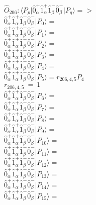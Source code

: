 \documentclass[14pt]{article}
\begin{document}
    $\hat{O}_{206}:  \langle{P_p}\vert \hat{0}_{\alpha}^{+}\hat{1}_{\alpha}^{+}\hat{1}_{\beta}^{-}\hat{0}_{\beta}^{-} \vert{P_q}\rangle => $ \\ 
    $ \hat{0}_{\alpha}^{+}\hat{1}_{\alpha}^{+}\hat{1}_{\beta}^{-}\hat{0}_{\beta}^{-} \vert{P_{0}}\rangle =  $ \\ 
    $ \hat{0}_{\alpha}^{+}\hat{1}_{\alpha}^{+}\hat{1}_{\beta}^{-}\hat{0}_{\beta}^{-} \vert{P_{1}}\rangle =  $ \\ 
    $ \hat{0}_{\alpha}^{+}\hat{1}_{\alpha}^{+}\hat{1}_{\beta}^{-}\hat{0}_{\beta}^{-} \vert{P_{2}}\rangle =  $ \\ 
    $ \hat{0}_{\alpha}^{+}\hat{1}_{\alpha}^{+}\hat{1}_{\beta}^{-}\hat{0}_{\beta}^{-} \vert{P_{3}}\rangle =  $ \\ 
    $ \hat{0}_{\alpha}^{+}\hat{1}_{\alpha}^{+}\hat{1}_{\beta}^{-}\hat{0}_{\beta}^{-} \vert{P_{4}}\rangle =  $ \\ 
    $ \hat{0}_{\alpha}^{+}\hat{1}_{\alpha}^{+}\hat{1}_{\beta}^{-}\hat{0}_{\beta}^{-} \vert{P_{5}}\rangle = {r}_{206,4,5}P_{4} $ \\ 
    ${r}_{206,4,5}\ =\ 1 $ \\ 
    $ \hat{0}_{\alpha}^{+}\hat{1}_{\alpha}^{+}\hat{1}_{\beta}^{-}\hat{0}_{\beta}^{-} \vert{P_{6}}\rangle =  $ \\ 
    $ \hat{0}_{\alpha}^{+}\hat{1}_{\alpha}^{+}\hat{1}_{\beta}^{-}\hat{0}_{\beta}^{-} \vert{P_{7}}\rangle =  $ \\ 
    $ \hat{0}_{\alpha}^{+}\hat{1}_{\alpha}^{+}\hat{1}_{\beta}^{-}\hat{0}_{\beta}^{-} \vert{P_{8}}\rangle =  $ \\ 
    $ \hat{0}_{\alpha}^{+}\hat{1}_{\alpha}^{+}\hat{1}_{\beta}^{-}\hat{0}_{\beta}^{-} \vert{P_{9}}\rangle =  $ \\ 
    $ \hat{0}_{\alpha}^{+}\hat{1}_{\alpha}^{+}\hat{1}_{\beta}^{-}\hat{0}_{\beta}^{-} \vert{P_{10}}\rangle =  $ \\ 
    $ \hat{0}_{\alpha}^{+}\hat{1}_{\alpha}^{+}\hat{1}_{\beta}^{-}\hat{0}_{\beta}^{-} \vert{P_{11}}\rangle =  $ \\ 
    $ \hat{0}_{\alpha}^{+}\hat{1}_{\alpha}^{+}\hat{1}_{\beta}^{-}\hat{0}_{\beta}^{-} \vert{P_{12}}\rangle =  $ \\ 
    $ \hat{0}_{\alpha}^{+}\hat{1}_{\alpha}^{+}\hat{1}_{\beta}^{-}\hat{0}_{\beta}^{-} \vert{P_{13}}\rangle =  $ \\ 
    $ \hat{0}_{\alpha}^{+}\hat{1}_{\alpha}^{+}\hat{1}_{\beta}^{-}\hat{0}_{\beta}^{-} \vert{P_{14}}\rangle =  $ \\ 
    $ \hat{0}_{\alpha}^{+}\hat{1}_{\alpha}^{+}\hat{1}_{\beta}^{-}\hat{0}_{\beta}^{-} \vert{P_{15}}\rangle =  $ \\ 
    
\end{document}
